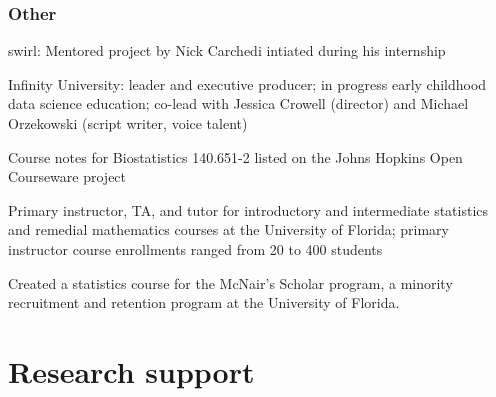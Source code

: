 \documentclass[12pt]{article}
\begin{document}
\subsubsection*{Other} 
\begin{description}
\item swirl: Mentored project by Nick Carchedi intiated during his internship
\item Infinity University: leader and executive producer; in progress early childhood data science education; co-lead with Jessica Crowell (director) and Michael Orzekowski (script writer, voice talent)
\item Course notes for Biostatistics 140.651-2 listed on the Johns Hopkins Open Courseware project 
\item Primary instructor, TA, and tutor for introductory and intermediate statistics and remedial mathematics 
courses at the University of Florida; primary instructor course enrollments ranged from 20 to 400 
students 
\item Created a statistics course for the McNair’s Scholar program, a minority recruitment and retention 
program at the University of Florida. 
\end{description}

\section*{Research support} 
\end{document}
